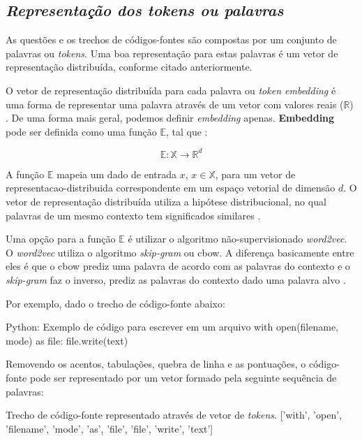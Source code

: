 \subsection{\textit{Representação dos \textit{tokens} ou palavras}}

As questões e os trechos de códigos-fontes são compostas por um conjunto de palavras ou \textit{tokens}. Uma boa representação para estas palavras é um vetor de representação distribuída, conforme citado anteriormente. 

O vetor de representação distribuída para cada palavra ou \textit{token embedding} é uma forma de representar uma palavra através de um vetor com valores reais ($\mathbb{R}$)  . De uma forma mais geral, podemos definir \textit{embedding} apenas. \textbf{Embedding} pode ser definida como uma função $\mathbb{E}$, tal que \citep{cambronero-deep-learning-code-search:2019}:

\begin{equation}
    \mathbb{E}: \mathbb{X} \rightarrow \mathbb{R}^{d}
\end{equation}

A função $\mathbb{E}$ mapeia um dado de entrada $x$, $x \in \mathbb{X}$, para um vetor de \gls{representacao-distribuida} correspondente em um espaço vetorial de dimensão $d$. O vetor de representação distribuída utiliza a hipótese distribucional, no qual palavras de um mesmo contexto tem significados similares \citep{Goodfellow-et-al-2016:representation-learning}.

Uma opção para a função $\mathbb{E}$ é utilizar o algoritmo não-supervisionado \textit{word2vec}. O \textit{word2vec} utiliza o algoritmo \textit{skip-gram} ou \acrshort{cbow}. A diferença basicamente entre eles é que o \acrshort{cbow} prediz uma palavra de acordo com as palavras do contexto e o \textit{skip-gram} faz o inverso, prediz as palavras do contexto dado uma palavra alvo \citep{mikolov2013distributed}.

Por exemplo, dado o trecho de código-fonte abaixo:

\begin{mypython}{Python: Exemplo de código para escrever em um arquivo}
with open(filename, mode) as file:
    file.write(text)
\end{mypython}

Removendo os acentos, tabulações, quebra de linha e as pontuações, o código-fonte pode ser representado por um vetor formado pela seguinte sequência de palavras:

\begin{mypythonembedding}{Trecho de código-fonte representado através de vetor de \textit{tokens}.}
  ['with', 'open', 'filename', 'mode', 'as', 'file', 'file', 'write', 'text']
\end{mypythonembedding}

